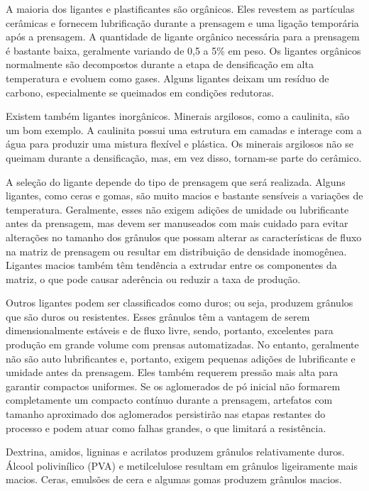 A maioria dos ligantes e plastificantes são orgânicos. Eles revestem as partículas cerâmicas e fornecem lubrificação durante a prensagem e uma ligação temporária após a prensagem. A quantidade de ligante orgânico necessária para a prensagem é bastante baixa, geralmente variando de 0,5 a 5\% em peso. Os ligantes orgânicos normalmente são decompostos durante a etapa de densificação em alta temperatura e evoluem como gases. Alguns ligantes deixam um resíduo de carbono, especialmente se queimados em condições redutoras.

Existem também ligantes inorgânicos. Minerais argilosos, como a caulinita, são um bom exemplo. A caulinita possui uma estrutura em camadas e interage com a água para produzir uma mistura flexível e plástica. Os minerais argilosos não se queimam durante a densificação, mas, em vez disso, tornam-se parte do cerâmico.

A seleção do ligante depende do tipo de prensagem que será realizada. Alguns ligantes, como ceras e gomas, são muito macios e bastante sensíveis a variações de temperatura. Geralmente, esses não exigem adições de umidade ou lubrificante antes da prensagem, mas devem ser manuseados com mais cuidado para evitar alterações no tamanho dos grânulos que possam alterar as características de fluxo na matriz de prensagem ou resultar em distribuição de densidade inomogênea. Ligantes macios também têm tendência a extrudar entre os componentes da matriz, o que pode causar aderência ou reduzir a taxa de produção.

Outros ligantes podem ser classificados como duros; ou seja, produzem grânulos que são duros ou resistentes. Esses grânulos têm a vantagem de serem dimensionalmente estáveis e de fluxo livre, sendo, portanto, excelentes para produção em grande volume com prensas automatizadas. No entanto, geralmente não são auto lubrificantes e, portanto, exigem pequenas adições de lubrificante e umidade antes da prensagem. Eles também requerem pressão mais alta para garantir compactos uniformes. Se os aglomerados de pó inicial não formarem completamente um compacto contínuo durante a prensagem, artefatos com tamanho aproximado dos aglomerados persistirão nas etapas restantes do processo e podem atuar como falhas grandes, o que limitará a resistência.

Dextrina, amidos, ligninas e acrilatos produzem grânulos relativamente duros. Álcool polivinílico (PVA) e metilcelulose resultam em grânulos ligeiramente mais macios. Ceras, emulsões de cera e algumas gomas produzem grânulos macios.

